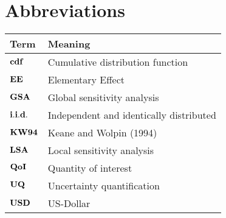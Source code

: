 

\section*{Abbreviations} %
\thispagestyle{plain} %

\phantom{This text will be invisible} 
\hspace{20cm}



\begin{table}[H]
	\centering
	\renewcommand{\arraystretch}{1.2}%
	\begin{tabular}{@{}ll@{}}
		\toprule
	Term\phantom{space}	& Meaning \\ \midrule
			$\bold{cdf}$	& Cumulative distribution function \\
		$\bold{EE}$	& Elementary Effect \\
	$\bold{GSA}$	& Global sensitivity analysis \\
	$\bold{i.i.d.}$	& Independent and identically distributed  \\
	$\bold{KW94}$	& Keane and Wolpin (1994)  \\
	$\bold{LSA}$	& Local sensitivity analysis \\
    $\bold{QoI}$	& Quantity of interest \\
    $\bold{UQ}$	& Uncertainty quantification \\
    $\bold{USD}$	& US-Dollar  \\
 \bottomrule
	\end{tabular}
\end{table}
